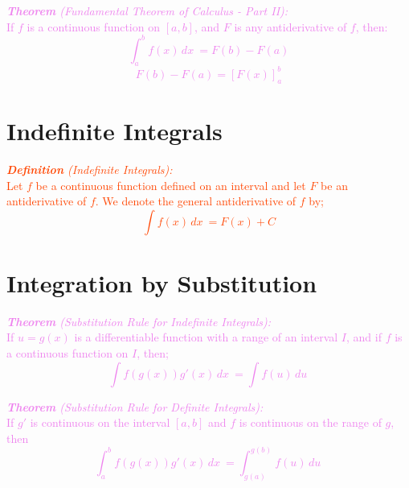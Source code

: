 \documentclass{report}
\newenvironment{definition}[1][OrangeRed]
  {\begin{tcolorbox}[colframe=#1,colback=white]}
  {\end{tcolorbox}}
\newenvironment{theorem}[1][Violet]
  {\begin{tcolorbox}[colframe=#1,colback=white]}
  {\end{tcolorbox}}
\begin{document}
\begin{theorem}
    \textcolor{Violet}{\textit{\textbf{Theorem} (Fundamental Theorem of Calculus - Part II):}\\
    If $f$ is a continuous function on $[a,b]$, and $F$ is any antiderivative of $f$, then:
    \begin{equation}
        \int_a^b f(x) \,dx\ = F(b)-F(a)
    \end{equation}
    \begin{equation}
        F(b) - F(a) = [F(x)]_a^b
    \end{equation}}
\end{theorem}

\section{Indefinite Integrals}

\begin{definition}
    \textcolor{OrangeRed}{\textit{\textbf{Definition} (Indefinite Integrals):}\\
    Let $f$ be a continuous function defined on an interval and let $F$ be an antiderivative of $f$. We denote the general antiderivative of $f$ by;
    \begin{equation}
        \int f(x) \,dx\ = F(x) + C
    \end{equation}}
\end{definition}

\section{Integration by Substitution}

\begin{theorem}
    \textcolor{Violet}{\textit{\textbf{Theorem} (Substitution Rule for Indefinite Integrals):}\\
    If $u = g(x)$ is a differentiable function with a range of an interval $I$, and if $f$ is a continuous function on $I$, then;
    \begin{equation}
        \int f(g(x))g'(x) \,dx\ = \int f(u) \,du\
    \end{equation}}
\end{theorem}

\begin{theorem}
    \textcolor{Violet}{\textit{\textbf{Theorem} (Substitution Rule for Definite Integrals):}\\
    If $g'$ is continuous on the interval $[a,b]$ and $f$ is continuous on the range of $g$, then
    \begin{equation}
        \int_a^b f(g(x))g'(x) \,dx\ = \int_{g(a)}^{g(b)} f(u) \,du\
    \end{equation}}
\end{theorem}
\end{document}
